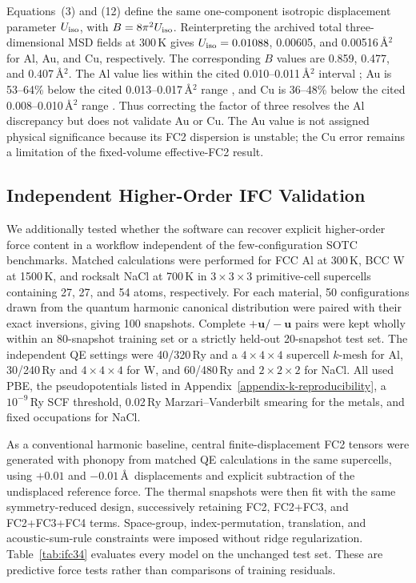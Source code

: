 \documentclass[aps,prb,reprint,amsmath,amssymb,floatfix]{revtex4-2}
\begin{document}
\color{revisionblue}
Equations~(3) and (12) define the same one-component isotropic displacement
parameter \(U_{\rm iso}\), with \(B=8\pi^2U_{\rm iso}\). Reinterpreting the archived total three-dimensional MSD fields at 300\,K gives \(U_{\rm iso}=0.01088\),
0.00605, and 0.00516\,\AA\(^2\) for Al, Au, and Cu, respectively. The
corresponding \(B\) values are 0.859, 0.477, and 0.407\,\AA\(^2\). The Al
value lies within the cited 0.010--0.011\,\AA\(^2\) interval
\cite{ref36}; Au is 53--64\% below the cited 0.013--0.017\,\AA\(^2\)
range \cite{ref37}, and Cu is 36--48\% below the cited
0.008--0.010\,\AA\(^2\) range \cite{ref38}. Thus correcting the factor of
three resolves the Al discrepancy but does not validate Au or Cu. The Au value
is not assigned physical significance because its FC2 dispersion is unstable;
the Cu error remains a limitation of the fixed-volume effective-FC2 result.
\color{black}

\color{revisionblue}
\subsection{Independent Higher-Order IFC
Validation}\label{independent-higher-order-ifc-validation}
\color{black}

\color{revisionblue}
We additionally tested whether the software can recover explicit higher-order
force content in a workflow independent of the few-configuration SOTC
benchmarks.  Matched calculations were performed for FCC Al at 300\,K, BCC W
at 1500\,K, and rocksalt NaCl at 700\,K in \(3\times3\times3\)
primitive-cell supercells containing 27, 27, and 54 atoms, respectively.
For each material, 50 configurations drawn from the quantum harmonic canonical
distribution were paired with their exact inversions, giving 100 snapshots.
Complete \(+\mathbf u/-\mathbf u\) pairs were kept wholly within an
80-snapshot training set or a strictly held-out 20-snapshot test set.
The independent QE settings were 40/320\,Ry and a \(4\times4\times4\)
supercell \(k\)-mesh for Al, 30/240\,Ry and \(4\times4\times4\) for W,
and 60/480\,Ry and \(2\times2\times2\) for NaCl. All used PBE, the
pseudopotentials listed in Appendix~\ref{appendix-k-reproducibility}, a
\(10^{-9}\)\,Ry SCF threshold, 0.02\,Ry Marzari--Vanderbilt smearing for
the metals, and fixed occupations for NaCl.
\color{black}

\color{revisionblue}
As a conventional harmonic baseline, central finite-displacement FC2 tensors
were generated with phonopy from matched QE calculations in the same
supercells, using \(+\!0.01\) and \(-\!0.01\)\,\AA\ displacements and
explicit subtraction of the undisplaced reference force.  The thermal
snapshots were then fit with the same symmetry-reduced design,
successively retaining FC2, FC2+FC3, and FC2+FC3+FC4 terms.  Space-group,
index-permutation, translation, and acoustic-sum-rule constraints were imposed
without ridge regularization.  Table~\ref{tab:ifc34} evaluates every model on
the unchanged test set.  These are predictive force tests rather than
comparisons of training residuals.
\color{black}
\end{document}
